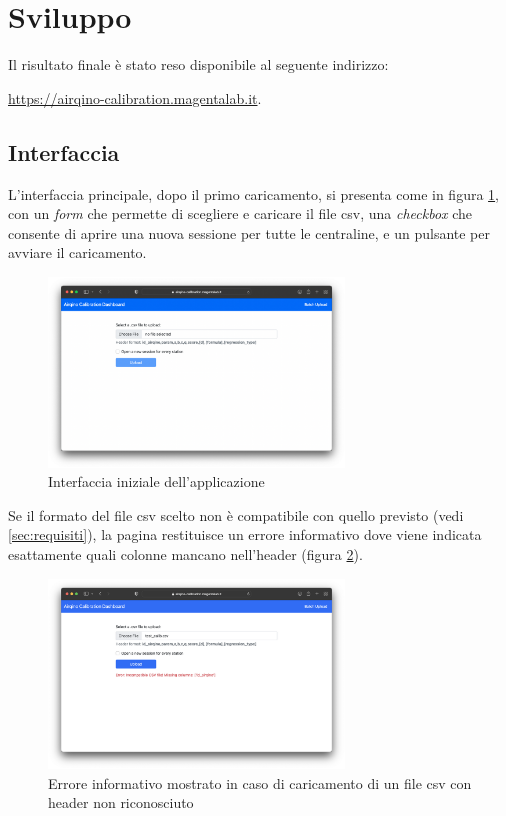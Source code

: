 \section{Sviluppo}\label{sec:sviluppo}
Il risultato finale è stato reso disponibile al seguente indirizzo:\

\url{https://airqino-calibration.magentalab.it}.

\subsection{Interfaccia}\label{sec:interfaccia}

L'interfaccia principale, dopo il primo caricamento, si presenta come in figura \ref{fig:interfaccia-1}, con un \textit{form} che permette di scegliere e caricare il file csv, una \textit{checkbox} che consente di aprire una nuova sessione per tutte le centraline, e un pulsante per avviare il caricamento.
\begin{figure}[H]
\centering
\includegraphics[width=0.70\textwidth,height=\textheight,keepaspectratio]{img/interfaccia_1}
\caption{Interfaccia iniziale dell'applicazione}
\label{fig:interfaccia-1}
\end{figure}

Se il formato del file csv scelto non è compatibile con quello previsto (vedi \ref{sec:requisiti}), la pagina restituisce un errore informativo dove viene indicata esattamente quali colonne mancano nell'header (figura \ref{fig:interfaccia-8}).

\begin{figure}[H]
\centering
\includegraphics[width=0.70\textwidth,height=\textheight,keepaspectratio]{img/interfaccia_8}
\caption{Errore informativo mostrato in caso di caricamento di un file csv con header non riconosciuto}
\label{fig:interfaccia-8}
\end{figure}

